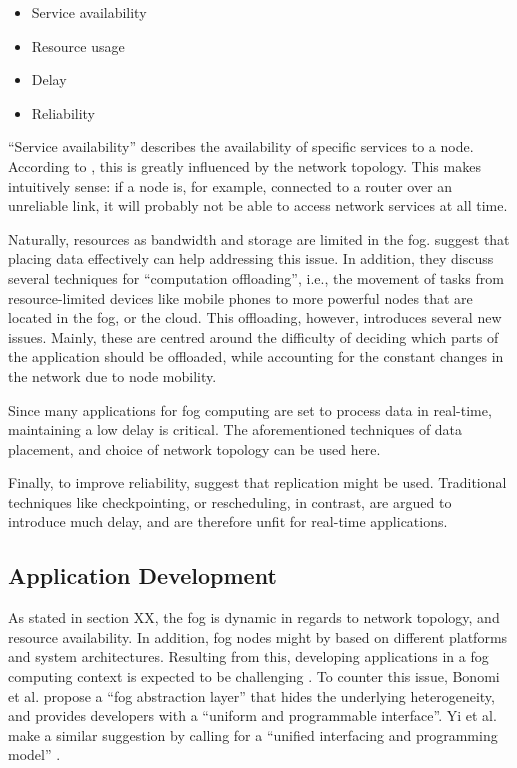 \documentclass{article}
\begin{document}
\begin{itemize}
	\item Service availability
	\item Resource usage
	\item Delay
	\item Reliability
\end{itemize}

``Service availability'' describes the availability of specific services to a node. According to \cite{yi2015survey}, this is greatly influenced by the network topology. This makes intuitively sense: if a node is, for example, connected to a router over an unreliable link, it will probably not be able to access network services at all time.

Naturally, resources as bandwidth and storage are limited in the fog. \cite{yi2015survey} suggest that placing data effectively can help addressing this issue. In addition, they discuss several techniques for ``computation offloading'', i.e., the movement of tasks from resource-limited devices like mobile phones to more powerful nodes that are located in the fog, or the cloud. This offloading, however, introduces several new issues. Mainly, these are centred around the difficulty of deciding which parts of the application should be offloaded, while accounting for the constant changes in the network due to node mobility.

Since many applications for fog computing are set to process data in real-time, maintaining a low delay is critical. The aforementioned techniques of data placement, and choice of network topology can be used here.

Finally, to improve reliability, \cite{yi2015survey} suggest that replication might be used. Traditional techniques like checkpointing, or rescheduling, in contrast, are argued to introduce much delay, and are therefore unfit for real-time applications.

\subsection{Application Development}
As stated in section XX, the fog is dynamic in regards to network topology, and resource availability. In addition, fog nodes might by based on different platforms and system architectures. Resulting from this, developing applications in a fog computing context is expected to be challenging \cite{yi2015survey}. To counter this issue, Bonomi et al. \cite{bonomi2014fog} propose a ``fog abstraction layer'' that hides the underlying heterogeneity, and provides developers with a ``uniform and programmable interface''. Yi et al. make a similar suggestion by calling for a ``unified interfacing and programming model'' \cite{yi2015survey}.
\end{document}
